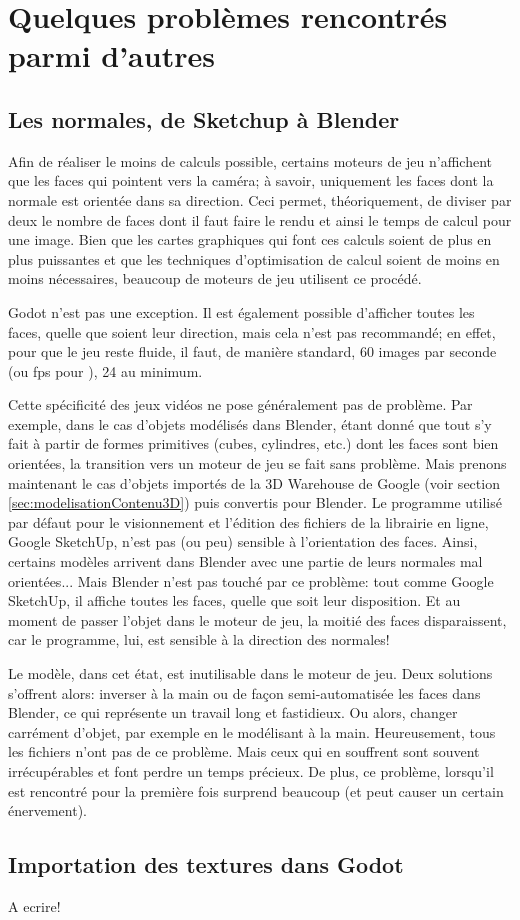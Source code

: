 \section{Quelques problèmes rencontrés parmi d'autres}
\subsection{Les normales, de Sketchup à Blender}
Afin de réaliser le moins de calculs possible, certains moteurs de jeu n'affichent que les faces qui pointent vers la caméra; à savoir, uniquement les faces dont la normale est orientée dans sa direction. Ceci permet, théoriquement, de diviser par deux le nombre de faces dont il faut faire le rendu et ainsi le temps de calcul pour une image. Bien que les cartes graphiques qui font ces calculs soient de plus en plus puissantes et que les techniques d'optimisation de calcul soient de moins en moins nécessaires, beaucoup de moteurs de jeu utilisent ce procédé.

Godot n'est pas une exception. Il est également possible d'afficher toutes les faces, quelle que soient leur direction, mais cela n'est pas recommandé; en effet, pour que le jeu reste fluide, il faut, de manière standard, 60 images par seconde (ou fps pour ), 24 au minimum.

Cette spécificité des jeux vidéos ne pose généralement pas de problème. Par exemple, dans le cas d'objets modélisés dans Blender, étant donné que tout s'y fait à partir de formes primitives (cubes, cylindres, etc.) dont les faces sont bien orientées, la transition vers un moteur de jeu se fait sans problème. Mais prenons maintenant le cas d'objets importés de la 3D Warehouse de Google (voir section \ref{sec:modelisationContenu3D}) puis convertis pour Blender. Le programme utilisé par défaut pour le visionnement et l'édition des fichiers de la librairie en ligne, Google SketchUp, n'est pas (ou peu) sensible à l'orientation des faces. Ainsi, certains modèles arrivent dans Blender avec une partie de leurs normales mal orientées... Mais Blender n'est pas touché par ce problème: tout comme Google SketchUp, il affiche toutes les faces, quelle que soit leur disposition. Et au moment de passer l'objet dans le moteur de jeu, la moitié des faces disparaissent, car le programme, lui,  est sensible à la direction des normales!

Le modèle, dans cet état, est inutilisable dans le moteur de jeu. Deux solutions s'offrent alors: inverser à la main ou de façon semi-automatisée les faces dans Blender, ce qui représente un travail long et fastidieux. Ou alors, changer carrément d'objet, par exemple en le modélisant à la main. Heureusement, tous les fichiers n'ont pas de ce problème. Mais ceux qui en souffrent  sont souvent irrécupérables et font perdre un temps précieux. De plus, ce problème, lorsqu'il est rencontré pour la première fois surprend beaucoup (et peut causer un certain énervement).


\subsection{Importation des textures dans Godot}
{\color{red} A ecrire!}